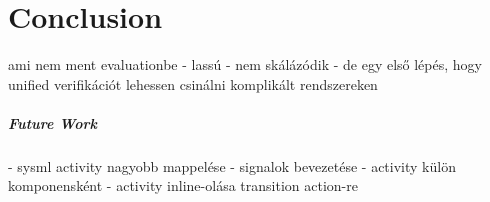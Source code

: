 \chapter{Conclusion}\label{ch:conclusion}

ami nem ment evaluationbe
 - lassú
 - nem skálázódik
 - de egy első lépés, hogy unified verifikációt lehessen csinálni komplikált rendszereken

\paragraph{Future Work}
 - sysml activity nagyobb mappelése
 - signalok bevezetése
 - activity külön komponensként
 - activity inline-olása transition action-re
